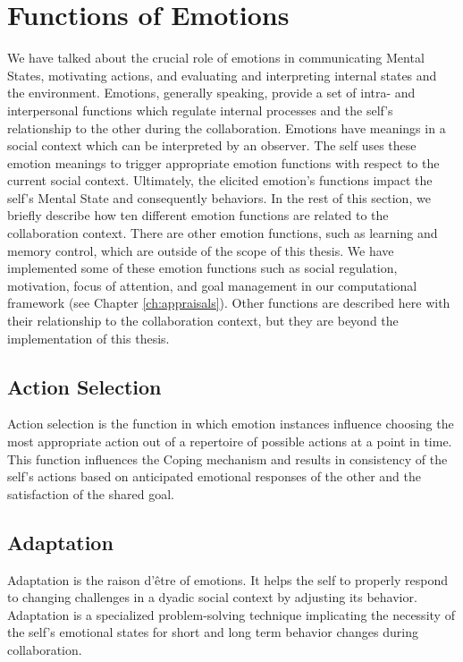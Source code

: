 \documentclass[12pt]{report}
\begin{document}
\section{Functions of Emotions}
\label{sec:emotion-functions}

We have talked about the crucial role of emotions in communicating Mental
States, motivating actions, and evaluating and interpreting internal states and
the environment. Emotions, generally speaking, provide a set of intra- and
interpersonal functions which regulate internal processes and the self's
relationship to the other during the collaboration. Emotions have meanings in a
social context which can be interpreted by an observer. The self uses these
emotion meanings to trigger appropriate emotion functions with respect to the
current social context. Ultimately, the elicited emotion's functions impact the
self's Mental State and consequently behaviors. In the rest of this section, we
briefly describe how ten different emotion functions are related to the
collaboration context. There are other emotion functions, such as learning and
memory control, which are outside of the scope of this thesis. {\color{red}We
have implemented some of these emotion functions such as social regulation,
motivation, focus of attention, and goal management in our computational
framework (see Chapter \ref{ch:appraisals}). Other functions are described here
with their relationship to the collaboration context, but they are beyond the
implementation of this thesis.}

\subsection{Action Selection} Action selection is the function in which
emotion instances influence choosing the most appropriate action out of a
repertoire of possible actions at a point in time. This function influences the
Coping mechanism and results in consistency of the self's actions based on
anticipated emotional responses of the other and the satisfaction of the shared
goal.

\subsection{Adaptation} Adaptation is the raison d'\^{e}tre of emotions. It
helps the self to properly respond to changing challenges in a dyadic social
context by adjusting its behavior. Adaptation is a specialized problem-solving
technique implicating the necessity of the self's emotional states for short and
long term behavior changes during collaboration.
\end{document}

